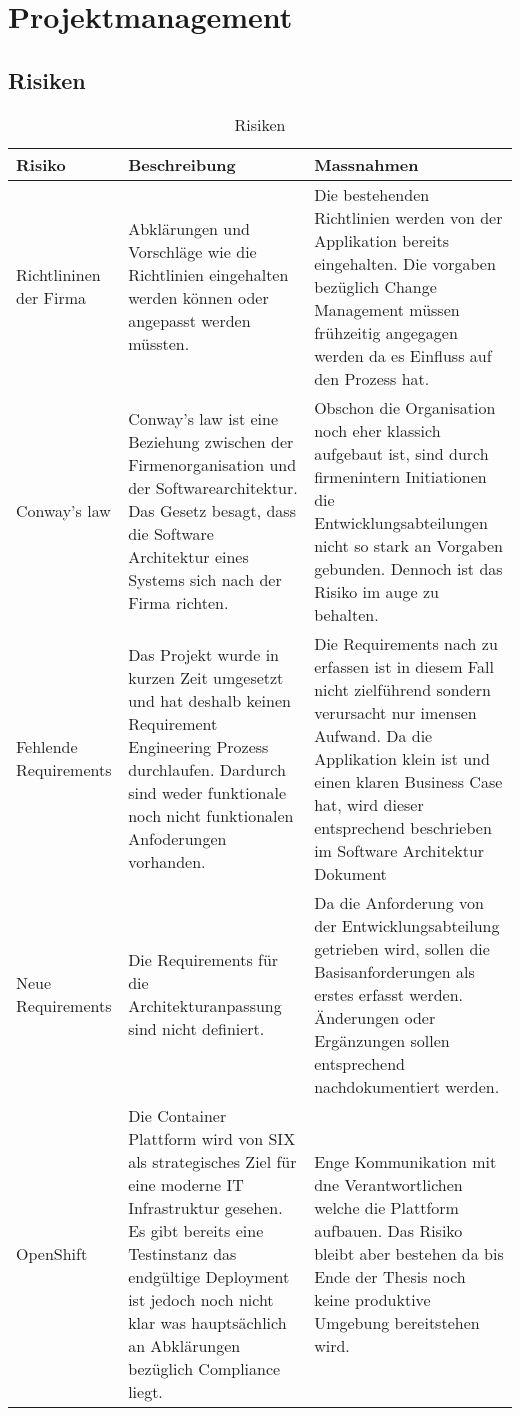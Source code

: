 \chapter{Projektmanagement}

\begin{landscape}
\thispagestyle{empty}

\section{Risiken}
	\begin{table}[h!]
		\centering
		\caption{Risiken}
		\label{tab:table1}
		\begin{tabular}{ | p{2cm} | p{10cm} | p{10cm} | }
			\toprule
			{\textbf{Risiko}} & {\textbf{Beschreibung}} & {\textbf{Massnahmen}} \\
			\midrule
			Richtlininen der Firma & Abklärungen und Vorschläge wie die Richtlinien eingehalten werden können oder angepasst werden müssten. & Die bestehenden Richtlinien werden von der Applikation bereits eingehalten. Die vorgaben bezüglich Change Management müssen frühzeitig angegagen werden da es Einfluss auf den Prozess hat. \\ \hline
			Conway's law & Conway's law ist eine Beziehung zwischen der Firmenorganisation und der Softwarearchitektur. Das Gesetz besagt, dass die Software Architektur eines Systems sich nach der Firma richten. & Obschon die Organisation noch eher klassich aufgebaut ist, sind durch firmenintern Initiationen die Entwicklungsabteilungen nicht so stark an Vorgaben gebunden. Dennoch ist das Risiko im auge zu behalten. \\ \hline
			Fehlende Requirements & Das Projekt wurde in kurzen Zeit umgesetzt und hat deshalb keinen Requirement Engineering Prozess durchlaufen. Dardurch sind weder funktionale noch nicht funktionalen Anfoderungen vorhanden. & Die Requirements nach zu erfassen ist in diesem Fall nicht zielführend sondern verursacht nur imensen Aufwand. Da die Applikation klein ist und einen klaren Business Case hat,  wird dieser entsprechend beschrieben im Software Architektur Dokument\\ \hline
			Neue Requirements & Die Requirements für die Architekturanpassung sind nicht definiert. & Da die Anforderung von der Entwicklungsabteilung getrieben wird, sollen die Basisanforderungen als erstes erfasst werden. Änderungen oder Ergänzungen sollen entsprechend nachdokumentiert werden.\\ \hline
			OpenShift & Die Container Plattform wird von SIX als strategisches Ziel für eine moderne IT Infrastruktur gesehen. Es gibt bereits eine Testinstanz das endgültige Deployment ist jedoch noch nicht klar was hauptsächlich an Abklärungen bezüglich Compliance liegt. & Enge Kommunikation mit dne Verantwortlichen welche die Plattform aufbauen. Das Risiko bleibt aber bestehen da bis Ende der Thesis noch keine produktive Umgebung bereitstehen wird. 
			\bottomrule
		\end{tabular}
	\end{table}
\vfill
\raisebox{0pt}{\makebox[\linewidth][r]{\thepage}}
\end{landscape}
\restoregeometry

